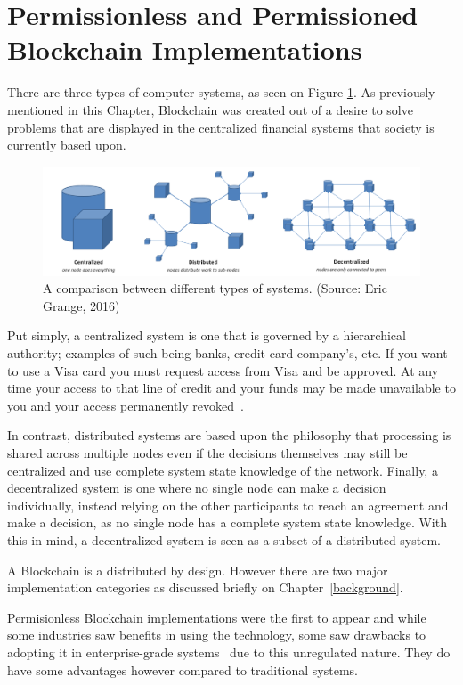 \section{Permissionless and Permissioned Blockchain Implementations}


There are three types of computer systems, as seen on Figure
\ref{fig:typesofnetworks}. As previously mentioned in this Chapter, Blockchain
was created out of a desire to solve problems that are displayed in the
centralized financial systems that society is currently based upon.

\begin{figure}[h]
	\centering
	\includegraphics[width=1\linewidth]{imgs/typesofnetworks.png}
  \caption{\label{fig:typesofnetworks} A comparison between different types of
  systems. (Source: Eric Grange, 2016)}
\end{figure}

Put simply, a centralized system is one that is governed by a hierarchical
authority; examples of such being banks, credit card company’s, etc. If you
want to use a Visa card you must request access from Visa and be approved. At
any time your access to that line of credit and your funds may be made
unavailable to you and your access permanently revoked~\cite{Dreifuerst2018}.

In contrast, distributed systems are based upon the philosophy that processing
is shared across multiple nodes even if the decisions themselves may still be
centralized and use complete system state knowledge of the network. Finally, a
decentralized system is one where no single node can make a decision
individually, instead relying on the other participants to reach an agreement
and make a decision, as no single node has a complete system state knowledge.
With this in mind, a decentralized system is seen as a subset of a distributed
system.

A Blockchain is a distributed by design. However there are two major
implementation categories as discussed briefly on Chapter~\ref{background}.

Permisionless Blockchain implementations were the first to appear and while
some industries saw benefits in using the technology, some saw drawbacks to
adopting it in enterprise-grade systems~\cite{Gopinath2016} due to this
unregulated nature. They do have some advantages however compared to
traditional systems.


